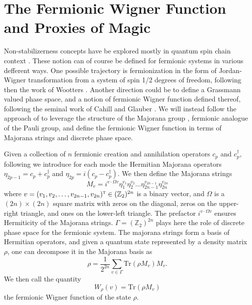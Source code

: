 \documentclass[aps, prl, twocolumn, groupedaddress, reprint, floatfix, nofootinbib, longbibliography]{revtex4-2}
\begin{document}
\section{The Fermionic Wigner Function and Proxies of Magic}

    Non-stabilizerness concepts have be explored mostly in quantum spin chain context \cite{goto2021chaos, oliviero2022magic, smith2406non, odavic2024stabilizer, passarelli2024nonstabilizerness, tarabunga2311magic, tarabunga2024critical}. These notion can of course be defined for fermionic systems in various defferent ways. One possible trajectory is fermionization in the form of Jordan-Wigner transformation from a system of spin 1/2 degrees of freedom, following then the work of Wootters \cite{wootters1987wigner, gibbons2004discrete}. Another direction could be to define a Grassmann valued phase space, and a notion of fermionic Wigner function defined thereof, following the seminal work of Cahill and Glauber \cite{cahill1999density}. We will instead follow the approach of \cite{mclauchlan2022fermion, mudassar2024encoding, collura2024quantum, bera2502non} to leverage the structure of the Majorana group \cite{bettaque2024structure}, fermionic analogue of the Pauli group, and define the fermionic Wigner function in terms of Majorana strings and discrete phase space.

    Given a collection of $n$ fermionic creation and annihilation operators $c_p$ and $c_p^\dagger$, following \cite{bettaque2024structure, bera2502non} we introduce for each mode the Hermitian Majorana operators $\eta_{2p-1} = c_p + c_p^\dagger$ and $\eta_{2p} = i(c_p - c_p^\dagger)$. We then define the Majorana strings
    \begin{equation}
        M_v = i^{v\cdot \Omega v} \eta_{1}^{v_{1}}\eta_{2}^{v_{2}}\dots\eta_{2n-1}^{v_{2n-1}}\eta_{2n}^{v_{2n}}
    \end{equation}
    where $v = (v_1, v_2, \dots, v_{2n-1}, v_{2n})^\textsc{t} \in (\mathbb Z_2)^{2n}$ is a binary vector, and $\Omega$ is a $(2n)\times(2n)$ square matrix with zeros on the diagonal, zeros on the upper-right triangle, and ones on the lower-left triangle. The prefactor $i^{v\cdot \Omega v}$ ensures Hermiticity of the Majorana strings. $\Gamma=(\mathbb Z_2)^{2n}$ plays here the role of discrete phase space for the fermionic system. The majorana strings form a basis of Hermitian operators, and given a quantum state represented by a density matrix $\rho$, one can decompose it in the Majorana basis as
    \begin{equation}
        \rho = \frac{1}{2^{2n}}\sum_{v\in\Gamma}\text{Tr}(\rho M_v)M_v.
    \end{equation}
    We then call the quantity
    \begin{equation}
        W_\rho(v) = \text{Tr}(\rho M_v)
    \end{equation}
    the fermionic Wigner function of the state $\rho$.
\end{document}
